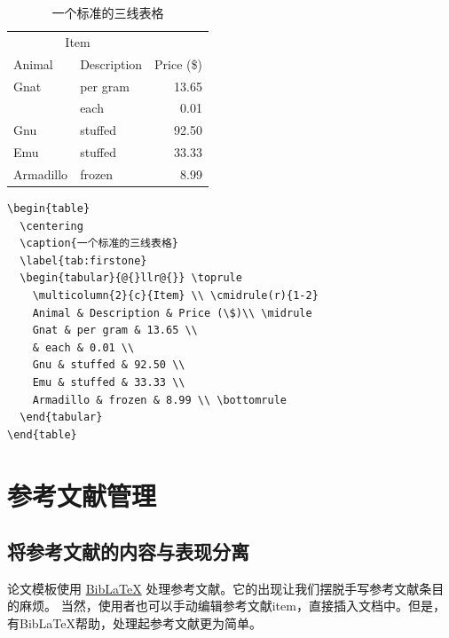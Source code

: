 \begin{table}
  \centering
  \caption{一个标准的三线表格}
  \label{tab:firstone}
  \begin{tabular}{@{}llr@{}} \toprule
    \multicolumn{2}{c}{Item} \\ \cmidrule(r){1-2}
    Animal & Description & Price (\$)\\ \midrule
    Gnat & per gram & 13.65 \\
    & each & 0.01 \\
    Gnu & stuffed & 92.50 \\
    Emu & stuffed & 33.33 \\
    Armadillo & frozen & 8.99 \\ \bottomrule
  \end{tabular}
\end{table}

\begin{lstlisting}[language={[LaTeX]TeX}, caption={三线表格}, label=raw:demo-table3]
\begin{table}
  \centering
  \caption{一个标准的三线表格}
  \label{tab:firstone}
  \begin{tabular}{@{}llr@{}} \toprule
    \multicolumn{2}{c}{Item} \\ \cmidrule(r){1-2}
    Animal & Description & Price (\$)\\ \midrule
    Gnat & per gram & 13.65 \\
    & each & 0.01 \\
    Gnu & stuffed & 92.50 \\
    Emu & stuffed & 33.33 \\
    Armadillo & frozen & 8.99 \\ \bottomrule
  \end{tabular}
\end{table}
\end{lstlisting}


\section{参考文献管理}
\label{sec:reference}
\subsection{将参考文献的内容与表现分离}

\BIThesis{}论文模板使用 \href{https://www.ctan.org/pkg/biblatex}{BibLaTeX} 处理参考文献。它的出现让我们摆脱手写参考文献条目
的麻烦。
当然，使用者也可以手动编辑参考文献item，直接插入文档中。但是，有BibLaTeX帮助，处理起参考文献更为简单。

